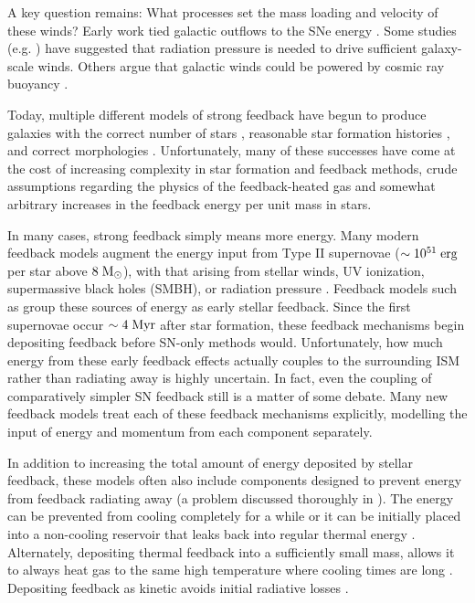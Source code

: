 A key question remains: What processes set the mass loading and velocity of
these winds?  Early work tied galactic outflows to the SNe energy
\citep{Springel2003}.  Some studies (e.g. \citealt{Murray2005,Krumholz2013})
have suggested that radiation pressure is needed to drive sufficient
galaxy-scale winds.  Others argue that galactic winds could be powered by cosmic
ray buoyancy \citep{Ipavich1975,Breitschwerdt1991,Socrates2008}.

Today, multiple different models of strong feedback have begun to produce
galaxies with the correct number of stars \citep{Aumer2013}, reasonable star
formation histories \citep{Stinson2013,Agertz2015,Munshi2013}, and correct
morphologies \citep{Guedes2011,Brook2012,Christensen2014}.   Unfortunately, many
of these successes have come at the cost of increasing complexity in star
formation and feedback methods, crude assumptions regarding the physics of the
feedback-heated gas and somewhat arbitrary increases in the feedback energy per
unit mass in stars.  

In many cases, strong feedback simply means more energy.  Many modern feedback
models augment the energy input from Type II supernovae ($\sim10^{51}\;
\rm{erg}$ per star above $8\; \rm{M_\odot}$), with that arising from stellar
winds, UV ionization, supermassive black holes (SMBH), or radiation pressure
\citep{Vogelsberger2013, Agertz2015}.  Feedback models such as
\citet{Stinson2013} group these sources of energy as early stellar feedback.
Since the first supernovae occur $\sim4\; \rm{Myr}$ after star formation, these
feedback mechanisms begin depositing feedback before SN-only methods would.
Unfortunately, how much energy from these early feedback effects actually
couples to the surrounding ISM rather than radiating away is highly uncertain.
In fact, even the coupling of comparatively simpler SN feedback still is a
matter of some debate.  Many new feedback models \citep{Agertz2013, Aumer2013,
Hopkins2013} treat each of these feedback mechanisms explicitly, modelling the
input of energy and momentum from each component separately.  

In addition to increasing the total amount of energy deposited by stellar
feedback, these models often also include components designed to prevent energy
from feedback radiating away (a problem discussed thoroughly in
\citealt{Thacker2000}).   The energy can be prevented from cooling completely
for a while \citep{Stinson2013} or it can be initially placed into a non-cooling
reservoir that leaks back into regular thermal energy \citep{Agertz2013}.
Alternately, depositing thermal feedback into a sufficiently small mass, allows
it to always heat gas to the same high temperature where cooling times are long
\citep{DallaVecchia2012}.  Depositing feedback as kinetic avoids initial
radiative losses \citet{Springel2003,Agertz2013,Hopkins2013}.  

